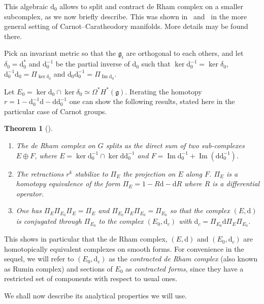 \documentclass[11pt]{article}
\newtheorem{theo}{Theorem}[section]
\theoremstyle{definition}
\newcommand{\pointir}{.\ ---\ }
\numberwithin{equation}{section}
\numberwithin{figure}{section}
\numberwithin{table}{section}
\DeclareMathOperator{\im}{Im}
\newcommand{\dd}{\mathrm{d}}
\begin{document}

This algebraic $\dd_0$ allows to split and contract de Rham complex on a smaller subcomplex, as we now briefly describe. This was shown in~\cite{Rumin_CRAS_1999} and~\cite{Rumin_TSG} in the more general setting of Carnot--Caratheodory manifolds. More details may be found there.

Pick an invariant metric so that the $\mathfrak{g}_i$ are orthogonal to each others, and let $\delta_0 = \dd_0^*$ and $\dd_0^{-1}$ be the partial inverse of $\dd_0$ such that $\ker \dd_0^{-1} = \ker \delta_0$, $\dd_0^{-1} \dd_0 = \Pi_{\ker \delta_0}$ and $\dd_0 \dd_0^{-1} = \Pi_{\im \dd_0}$.

Let $E_0 = \ker \dd_0 \cap \ker \delta_0 \simeq \Omega^* H^*(\mathfrak{g})$. Iterating the homotopy $r = 1 - \dd_0^{-1}\dd - \dd \dd_0 ^{-1}$ one can show the following results, stated here in the particular case of Carnot groups.

\let\oldpointir\pointir
\renewcommand{\pointir}{}
\begin{theo}[{\cite[Theorem~1]{Rumin_CRAS_1999}}]\label{thm:dc-complex}
\ %
\begin{enumerate}
\item The de Rham complex on $G$ splits as the direct sum of two sub-complexes $E \oplus F$, where $E = \ker \dd_0^{-1} \cap \ker \dd \dd_0^{-1}$ and $F= \im \dd_0^{-1} + \im (\dd\dd_0^{-1}) $.
\item The retractions $r^k$ stabilize to $\Pi_E$ the projection on $E$ along $F$. $\Pi_E$ is a homotopy equivalence of the form $\Pi_E = 1 - R\dd - \dd R$ where $R$ is a differential operator.
\item One has $\Pi_E \Pi_{E_0} \Pi_E = \Pi_E$ and $\Pi_{E_0} \Pi_E \Pi_{E_0} = \Pi_{E_0}$ so that the complex $(E,\dd)$ is conjugated through $\Pi_{E_0}$ to the complex $(E_0, \dd_c)$ with $\dd_c = \Pi_{E_0} \dd \Pi_E \Pi_{E_0}$.
\end{enumerate}
\end{theo}
\let\pointir\oldpointir

This shows in particular that the de Rham complex, $(E,\dd)$ and $(E_0, \dd_c)$ are homotopically equivalent complexes on smooth forms. For convenience in the sequel, we will refer to $(E_0,\dd_c)$ as the \emph{contracted de Rham complex} (also known as Rumin complex) and sections of $E_0$ as \emph{contracted forms}, since they have a restricted set of components with respect to usual ones.

We shall now describe its analytical properties we will use.
\end{document}
